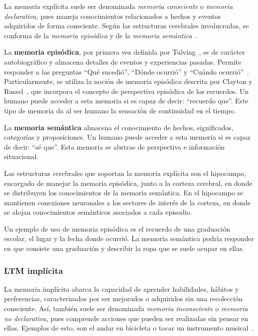 La memoria explícita suele ser denominada \textit{memoria consciente} o \textit{memoria declarativa}, pues maneja conocimientos relacionados a hechos y eventos adquiridos de forma consciente. Según las estructuras cerebrales involucradas, se conforma de la \textit{memoria episódica} y de la \textit{memoria semántica}~\cite{Eichenbaum:2008}.

La \textbf{memoria episódica}, por primera vez definida por Tulving~\cite{2_tulving}, es de carácter  autobiográfico y almacena detalles de eventos y experiencias pasadas. Permite responder a las preguntas ``Qué sucedió'', ``Dónde ocurrió'' y ``Cuándo ocurrió''~\cite{Deutsch2008}. Particularmente, se utiliza la noción de memoria episódica descrita por Clayton y Russel~\cite{CLAYTON20092330}, que incorpora el concepto de perspectiva episódica de los recuerdos. Un humano puede acceder a esta memoria si es capaz de decir: ``recuerdo que''. Este tipo de memoria da al ser humano la sensación de continuidad en el tiempo.

La \textbf{memoria semántica} almacena el conocimiento de hechos, significados, categorías y proposiciones. Un humano puede acceder a esta memoria si es capaz de decir: ``sé que''. Esta memoria se abstrae de perspectiva e información situacional.

Las estructuras cerebrales que soportan la memoria explícita son el hipocampo, encargado de manejar la memoria episódica, junto a la corteza cerebral, en donde se distribuyen los conocimientos de la memoria semántica. En el hipocampo se mantienen conexiones neuronales a los sectores de interés de la corteza, en donde se alojan conocimientos semánticos asociados a cada episodio.

Un ejemplo de uso de memoria episódica es el recuerdo de una graduación escolar, el lugar y la fecha donde ocurrió. La memoria semántica podría responder en que consiste una graduación y describir la ropa que se suele ocupar en ellas.



\subsubsection{LTM implícita}

La memoria implícita abarca la capacidad de aprender habilidades, hábitos y preferencias, caracterizados por ser mejorados o adquiridos sin una recolección consciente. Así, también suele ser denominada \textit{memoria inconsciente} o \textit{memoria no declarativa}, pues comprende acciones que pueden ser realizadas sin pensar en ellas. Ejemplos de esto, son el andar en bicicleta o tocar un instrumento musical~\cite{Eichenbaum:2008}.

